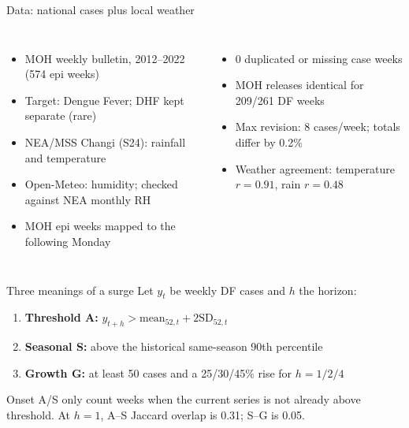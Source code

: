 \documentclass[aspectratio=169,11pt]{beamer}
\begin{document}
\begin{frame}{Data: national cases plus local weather}
  \begin{columns}[T]
      \begin{itemize}
        \item MOH weekly bulletin, 2012--2022 (574 epi weeks)
        \item Target: Dengue Fever; DHF kept separate (rare)
        \item NEA/MSS Changi (S24): rainfall and temperature
        \item Open-Meteo: humidity; checked against NEA monthly RH
        \item MOH epi weeks mapped to the following Monday
      \end{itemize}
      \begin{itemize}
        \item 0 duplicated or missing case weeks
        \item MOH releases identical for 209/261 DF weeks
        \item Max revision: 8 cases/week; totals differ by 0.2\%
        \item Weather agreement: temperature $r=0.91$, rain $r=0.48$
      \end{itemize}
  \end{columns}
\end{frame}

\begin{frame}{Three meanings of a surge}
  Let $y_t$ be weekly DF cases and $h$ the horizon:
  \begin{enumerate}
    \item \textbf{Threshold A:} $y_{t+h}>\text{mean}_{52,t}+2\text{SD}_{52,t}$
    \item \textbf{Seasonal S:} above the historical same-season 90th percentile
    \item \textbf{Growth G:} at least 50 cases and a 25/30/45\% rise for $h=1/2/4$
  \end{enumerate}
  \vspace{0.4em}
  Onset A/S only count weeks when the current series is not already above threshold.
  At $h=1$, A--S Jaccard overlap is 0.31; S--G is 0.05.
\end{frame}
\end{document}
